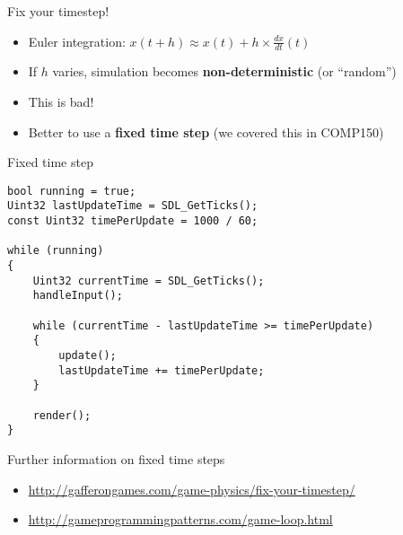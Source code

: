 \begin{frame}{Fix your timestep!}
	\begin{itemize}
		\pause\item Euler integration: $x(t+h) \approx x(t) + h \times \frac{dx}{dt}(t)$
		\pause\item If $h$ varies, simulation becomes \textbf{non-deterministic} (or ``random'')
		\pause\item This is bad!
		\pause\item Better to use a \textbf{fixed time step} (we covered this in COMP150)
	\end{itemize}
\end{frame}

\begin{frame}[fragile]{Fixed time step}
    \begin{lstlisting}
bool running = true;
Uint32 lastUpdateTime = SDL_GetTicks();
const Uint32 timePerUpdate = 1000 / 60;

while (running)
{
    Uint32 currentTime = SDL_GetTicks();
    handleInput();
    
    while (currentTime - lastUpdateTime >= timePerUpdate)
    {
        update();
        lastUpdateTime += timePerUpdate;
    }
    
    render();
}
    \end{lstlisting}
\end{frame}

\begin{frame}{Further information on fixed time steps}
    \begin{itemize}
        \item \url{http://gafferongames.com/game-physics/fix-your-timestep/}
        \item \url{http://gameprogrammingpatterns.com/game-loop.html}
    \end{itemize}
\end{frame}
